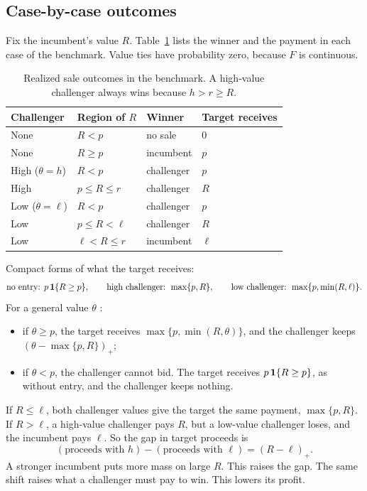 \subsection{Case-by-case outcomes}\label{sec:03_auction-cases}

Fix the incumbent's value \(R\). Table~\ref{tab:03_auction-cases} lists the winner and the payment in
each case of the benchmark. Value ties have probability zero, because \(F\) is continuous.

\begin{table}[!htbp]
\centering\small
\begin{tabular}{@{}llll@{}}
\toprule
Challenger & Region of \(R\) & Winner & Target receives\\
\midrule
None & \(R<p\) & no sale & \(0\)\\
None & \(R\ge p\) & incumbent & \(p\)\\
\midrule
High (\(\theta=h\)) & \(R<p\) & challenger & \(p\)\\
High & \(p\le R\le r\) & challenger & \(R\)\\
\midrule
Low (\(\theta=\ell\)) & \(R<p\) & challenger & \(p\)\\
Low & \(p\le R<\ell\) & challenger & \(R\)\\
Low & \(\ell<R\le r\) & incumbent & \(\ell\)\\
\bottomrule
\end{tabular}
\caption{Realized sale outcomes in the benchmark. A high-value challenger always wins because
\(h>r\ge R\).}
\label{tab:03_auction-cases}
\end{table}

Compact forms of what the target receives:
\[
\text{no entry: } p\,\mathbf{1}\{R\ge p\},\qquad
\text{high challenger: } \max\{p,R\},\qquad
\text{low challenger: } \max\{p,\min(R,\ell)\}.
\]
For a general value \(\theta\) :
\begin{itemize}
\item if \(\theta\ge p\), the target receives \(\max\{p,\min(R,\theta)\}\), and the challenger keeps
\((\theta-\max\{p,R\})_+\);
\item if \(\theta<p\), the challenger cannot bid. The target receives \(p\,\mathbf{1}\{R\ge p\}\), as without entry,
and the challenger keeps nothing.
\end{itemize}

\begin{intuition}
If \(R\le\ell\), both challenger values give the target the same payment,
\(\max\{p,R\}\). If \(R>\ell\), a high-value challenger pays \(R\), but a low-value challenger loses, and
the incumbent pays \(\ell\). So the gap in target proceeds is
\[
(\text{proceeds with }h)-(\text{proceeds with }\ell)=(R-\ell)_+ .
\]
A stronger incumbent puts more mass on large \(R\). This raises the gap. The same shift raises what a
challenger must pay to win. This lowers its profit.
\end{intuition}

